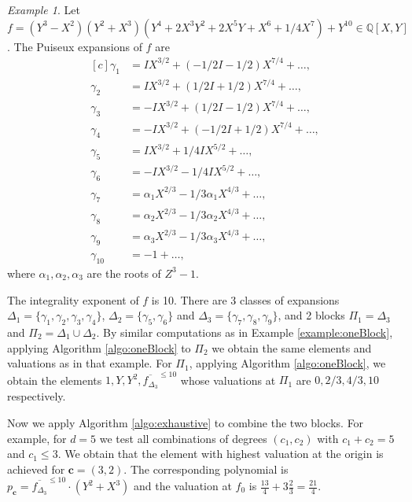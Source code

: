 \documentclass[a4paper,11pt]{amsart}%
\theoremstyle{definition}
\theoremstyle{plain}
\theoremstyle{remark}
\newtheorem{example}[defn]{Example}
\begin{document}
\begin{example}
Let $f = (Y^3-X^2)(Y^2+X^3)(Y^4 + 2X^3Y^2 + 2X^5Y + X^6 + 1/4X^7) + Y^{10} \in{\mathbb{Q}}[X,Y]$.
The Puiseux expansions of $f$ are
$$
\begin{aligned}[c]
\gamma_{1} &=IX^{3/2} +(-1/2I-1/2)X^{7/4} + \dots,\\
\gamma_{2} &=IX^{3/2} +(1/2I+1/2)X^{7/4} + \dots,\\
\gamma_{3} &=-IX^{3/2}+(1/2I-1/2)X^{7/4} + \dots,\\
\gamma_{4} &=-IX^{3/2}+(-1/2I+1/2)X^{7/4} + \dots,\\
\gamma_{5} &=IX^{3/2}+ 1/4 I X^{5/2} + \dots,\\
\gamma_{6} &=-IX^{3/2} - 1/4 I X^{5/2} +  \dots,\\
\gamma_{7} &=\alpha_1 X^{2/3} - 1/3 \alpha_1 X^{4/3} + \dots,\\
\gamma_{8} &=\alpha_2 X^{2/3} - 1/3 \alpha_2 X^{4/3} + \dots,\\
\gamma_{9} &=\alpha_3 X^{2/3} - 1/3 \alpha_3 X^{4/3} + \dots,\\
\gamma_{10} &=-1 + \dots,
\end{aligned}
$$
where $\alpha_1, \alpha_2, \alpha_3$ are the roots of $Z^3-1$.

The integrality exponent of $f$ is 10. There are 3 classes of expansions $\Delta_1 = \{\gamma_1, \gamma_2, \gamma_3, \gamma_4\}$, $\Delta_2 = \{\gamma_5, \gamma_6\}$ and $\Delta_3 = \{\gamma_7, \gamma_8, \gamma_9\}$, and 2 blocks $\Pi_1 = \Delta_3$ and $\Pi_2 = \Delta_1 \cup \Delta_2$. By similar computations as in Example \ref{example:oneBlock}, applying Algorithm \ref{algo:oneBlock} to $\Pi_2$ we obtain the same elements and valuations as in that example. For $\Pi_1$, applying Algorithm \ref{algo:oneBlock}, we obtain the elements $1, Y, Y^2, \overline{f_{\Delta_3}}^{\le 10}$ whose valuations at $\Pi_1$ are $0, 2/3, 4/3, 10$ respectively.

Now we apply Algorithm \ref{algo:exhaustive} to combine the two blocks. For example, for $d = 5$ we test all combinations of degrees $(c_1, c_2)$ with $c_1 + c_2 = 5$ and $c_1 \le 3$. We obtain that the element with highest valuation at the origin is achieved for $\bm{c} = (3,2)$. The corresponding polynomial is $p_{\bm{c}} = \overline{f_{\Delta_3}}^{\le 10} \cdot (Y^2 + X^3)$ and the valuation at $f_0$ is $\frac{13}{4} + 3\frac{2}{3} = \frac{21}{4}$.
\end{example}


\end{document}
